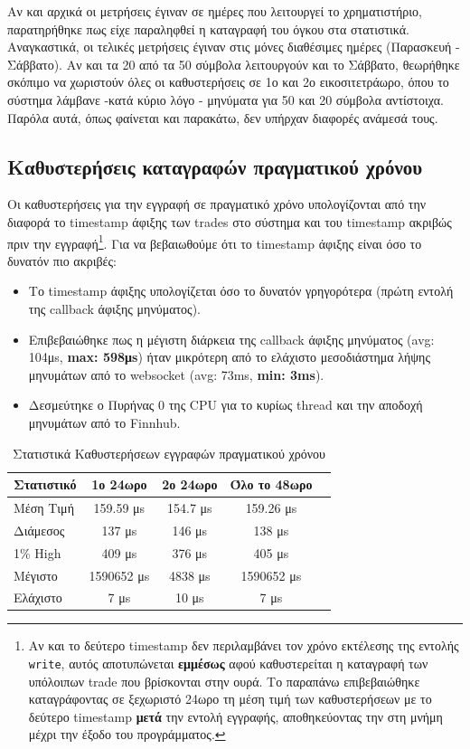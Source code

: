 \documentclass[12pt]{article}
\begin{document}
Αν και αρχικά οι μετρήσεις έγιναν σε ημέρες που λειτουργεί το χρηματιστήριο, παρατηρήθηκε πως είχε παραληφθεί η καταγραφή του όγκου στα στατιστικά. Αναγκαστικά, οι τελικές μετρήσεις έγιναν στις μόνες διαθέσιμες ημέρες (Παρασκευή - Σάββατο). Αν και τα 20 από τα 50 σύμβολα λειτουργούν και το Σάββατο, θεωρήθηκε σκόπιμο να χωριστούν όλες οι καθυστερήσεις σε 1ο και 2ο εικοσιτετράωρο, όπου το σύστημα λάμβανε -κατά κύριο λόγο - μηνύματα για 50 και 20 σύμβολα αντίστοιχα. Παρόλα αυτά, όπως φαίνεται και παρακάτω, δεν υπήρχαν διαφορές ανάμεσά τους.

\subsection{Καθυστερήσεις καταγραφών πραγματικού χρόνου}
Οι καθυστερήσεις για την εγγραφή σε πραγματικό χρόνο υπολογίζονται από την διαφορά το timestamp άφιξης των trades στο σύστημα και του timestamp ακριβώς πριν την εγγραφή\footnote{Αν και το δεύτερο timestamp δεν περιλαμβάνει τον χρόνο εκτέλεσης της εντολής \texttt{write}, αυτός αποτυπώνεται \textbf{εμμέσως} αφού καθυστερείται η καταγραφή των υπόλοιπων trade που βρίσκονται στην ουρά. Το παραπάνω επιβεβαιώθηκε καταγράφοντας σε ξεχωριστό 24ωρο τη μέση τιμή των καθυστερήσεων με το δεύτερο timestamp \textbf{μετά} την εντολή εγγραφής, αποθηκεύοντας την στη μνήμη μέχρι την έξοδο του προγράμματος.}. Για να βεβαιωθούμε ότι το timestamp άφιξης είναι όσο το δυνατόν πιο ακριβές:
\begin{itemize}
    \item Το timestamp άφιξης υπολογίζεται όσο το δυνατόν γρηγορότερα (πρώτη εντολή της callback άφιξης μηνύματος).
    \item Επιβεβαιώθηκε πως η μέγιστη διάρκεια της callback άφιξης μηνύματος  (avg: 104μs, \textbf{max: 598μs}) ήταν μικρότερη από το ελάχιστο μεσοδιάστημα λήψης μηνυμάτων από το websocket (avg: 73ms, \textbf{min: 3ms}).
        \item Δεσμεύτηκε ο Πυρήνας 0 της CPU για το κυρίως thread και την αποδοχή μηνυμάτων από το Finnhub.
\end{itemize}



\begin{table}[H]
    \centering
    \begin{tabular}{lcccc}
        \textbf{Στατιστικό} & \textbf{1ο 24ωρο} & \textbf{2ο 24ωρο} & \textbf{Όλο το 48ωρο}  \\
        \hline
        Μέση Τιμή     & 159.59 μs & 154.7 μs & 159.26 μs    \\
        Διάμεσος  & 137 μs & 146 μs & 138 μs \\
        1\% High & 409 μs & 376 μs & 405 μs  \\
        Μέγιστο      & 1590652 μs & 4838 μs & 1590652 μs \\
        Ελάχιστο      & 7 μs & 10 μs & 7 μs  \\
    \end{tabular}
    \caption{Στατιστικά Καθυστερήσεων εγγραφών πραγματικού χρόνου}
    \label{tab:minute_statistics}
\end{table}
\end{document}
